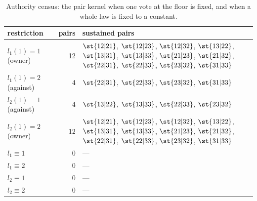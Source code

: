 \begin{table}[H]
\centering\footnotesize
\caption{Authority census: the pair kernel when one vote at the floor is fixed, and when a whole law is fixed to a constant.}
\label{tab:authority}
\begin{tabular}{lrp{}}
\toprule
restriction & pairs & sustained pairs \\
\midrule
$l_1(1)=1$ (owner) & 12 & $\st{12|21}$, $\st{12|23}$, $\st{12|32}$, $\st{13|22}$, $\st{13|31}$, $\st{13|33}$, $\st{21|23}$, $\st{21|32}$, $\st{22|31}$, $\st{22|33}$, $\st{23|32}$, $\st{31|33}$ \\
$l_1(1)=2$ (against) & 4 & $\st{22|31}$, $\st{22|33}$, $\st{23|32}$, $\st{31|33}$ \\
$l_2(1)=1$ (against) & 4 & $\st{13|22}$, $\st{13|33}$, $\st{22|33}$, $\st{23|32}$ \\
$l_2(1)=2$ (owner) & 12 & $\st{12|21}$, $\st{12|23}$, $\st{12|32}$, $\st{13|22}$, $\st{13|31}$, $\st{13|33}$, $\st{21|23}$, $\st{21|32}$, $\st{22|31}$, $\st{22|33}$, $\st{23|32}$, $\st{31|33}$ \\
$l_1\equiv 1$ & 0 & --- \\
$l_1\equiv 2$ & 0 & --- \\
$l_2\equiv 1$ & 0 & --- \\
$l_2\equiv 2$ & 0 & --- \\
\bottomrule
\end{tabular}
\end{table}
